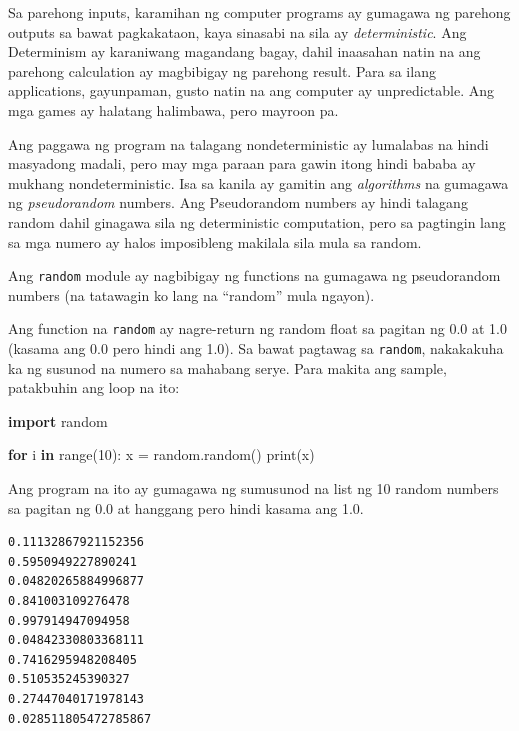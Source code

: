 \documentclass[10pt,]{book}
\newenvironment{Shaded}{}{}
\newcommand{\BuiltInTok}[1]{\textcolor[rgb]{0.00,0.50,0.00}{#1}}
\newcommand{\ControlFlowTok}[1]{\textcolor[rgb]{0.00,0.44,0.13}{\textbf{#1}}}
\newcommand{\DecValTok}[1]{\textcolor[rgb]{0.25,0.63,0.44}{#1}}
\newcommand{\ImportTok}[1]{\textcolor[rgb]{0.00,0.50,0.00}{\textbf{#1}}}
\newcommand{\KeywordTok}[1]{\textcolor[rgb]{0.00,0.44,0.13}{\textbf{#1}}}
\newcommand{\NormalTok}[1]{#1}
\newcommand{\OperatorTok}[1]{\textcolor[rgb]{0.40,0.40,0.40}{#1}}
\begin{document}
Sa parehong inputs, karamihan ng computer programs ay gumagawa ng
parehong outputs sa bawat pagkakataon, kaya sinasabi na sila ay
\emph{deterministic}. Ang Determinism ay karaniwang magandang bagay,
dahil inaasahan natin na ang parehong calculation ay magbibigay ng
parehong result. Para sa ilang applications, gayunpaman, gusto natin na
ang computer ay unpredictable. Ang mga games ay halatang halimbawa, pero
mayroon pa.

Ang paggawa ng program na talagang nondeterministic ay lumalabas na
hindi masyadong madali, pero may mga paraan para gawin itong hindi
bababa ay mukhang nondeterministic. Isa sa kanila ay gamitin ang
\emph{algorithms} na gumagawa ng \emph{pseudorandom} numbers. Ang
Pseudorandom numbers ay hindi talagang random dahil ginagawa sila ng
deterministic computation, pero sa pagtingin lang sa mga numero ay halos
imposibleng makilala sila mula sa random.

 

Ang \texttt{random} module ay nagbibigay ng functions na gumagawa ng
pseudorandom numbers (na tatawagin ko lang na ``random'' mula ngayon).

 

Ang function na \texttt{random} ay nagre-return ng random float sa
pagitan ng 0.0 at 1.0 (kasama ang 0.0 pero hindi ang 1.0). Sa bawat
pagtawag sa \texttt{random}, nakakakuha ka ng susunod na numero sa
mahabang serye. Para makita ang sample, patakbuhin ang loop na ito:

\begin{Shaded}
\begin{Highlighting}[]
\ImportTok{import}\NormalTok{ random}

\ControlFlowTok{for}\NormalTok{ i }\KeywordTok{in} \BuiltInTok{range}\NormalTok{(}\DecValTok{10}\NormalTok{):}
\NormalTok{    x }\OperatorTok{=}\NormalTok{ random.random()}
    \BuiltInTok{print}\NormalTok{(x)}
\end{Highlighting}
\end{Shaded}

Ang program na ito ay gumagawa ng sumusunod na list ng 10 random numbers
sa pagitan ng 0.0 at hanggang pero hindi kasama ang 1.0.

{\small
\begin{verbatim}
0.11132867921152356
0.5950949227890241
0.04820265884996877
0.841003109276478
0.997914947094958
0.04842330803368111
0.7416295948208405
0.510535245390327
0.27447040171978143
0.028511805472785867
\end{verbatim}
}
\end{document}
